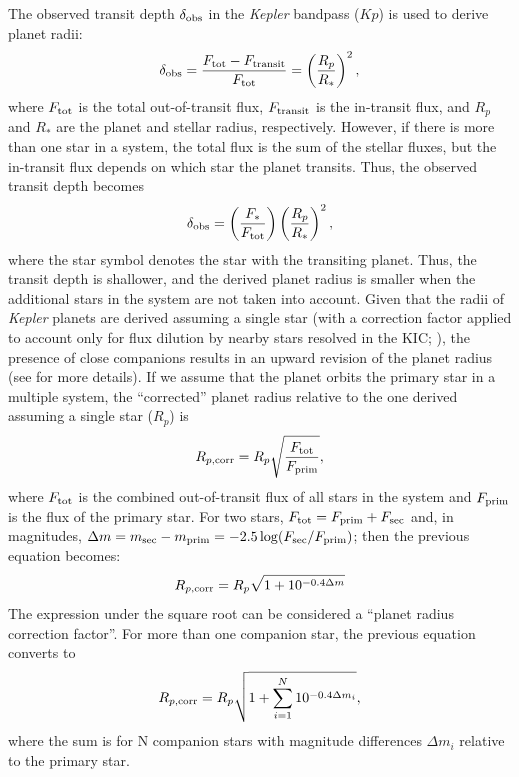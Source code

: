 \documentclass[twocolumn,appendixfloats]{aastex6}
\begin{document}
The observed transit depth $\delta_{\rm obs}$ in the {\it Kepler} bandpass 
($Kp$) is used to derive planet radii:
\begin{equation}
\delta_{\rm obs} = \frac{F_{\rm tot}-F_{\rm transit}}{F_{\rm tot}} = 
\left( \frac{R_p}{R_{\ast}} \right)^2, 
\end{equation}
where $F_{\rm tot}$ is the total out-of-transit flux, $F_{\rm transit}$
is the in-transit flux, and $R_p$ and $R_{\ast}$ are the planet and stellar
radius, respectively. However, if there is more than one star in a
system, the total flux is the sum of the stellar fluxes, but the in-transit flux
depends on which star the planet transits. Thus, the observed transit
depth becomes
\begin{equation}
\delta_{\rm obs} = \left( \frac{F_{\ast}}{F_{\rm tot}} \right)
\left( \frac{R_p}{R_{\ast}} \right)^2, 
\end{equation}
where the star symbol denotes the star with the transiting planet. Thus,
the transit depth is shallower, and the derived planet radius is smaller
when the additional stars in the system are not taken into account. 
Given that the radii of {\it Kepler} planets are derived assuming a single
star (with a correction factor applied to account only for flux 
dilution by nearby stars resolved in the KIC; \citealt{mullally15,coughlin16}), 
the presence of close companions results in an upward revision 
of the planet radius (see \citealt{ciardi15} for more details). 
If we assume that the planet orbits the primary star in a multiple system, the 
``corrected'' planet radius relative to the one derived assuming a single star 
($R_p$) is
\begin{equation}
R_{p, \rm corr} = R_p \sqrt{\frac{F_{\rm tot}}{F_{\rm prim}}},
\end{equation}
where $F_{\rm tot}$ is the combined out-of-transit flux of all stars in the 
system and $F_{\rm prim}$ is the flux of the primary star. For two stars, 
$F_{\rm tot}=F_{\rm prim}+F_{\rm sec}$ and, in magnitudes, 
$\Delta m = m_{\rm sec} - m_{\rm prim} = 
- 2.5 \log (F_{\rm sec}/F_{\rm prim})$; then the previous equation 
becomes:
\begin{equation}
R_{p, \rm corr} = R_p \sqrt{1+10^{-0.4 \Delta m}}
\end{equation}
The expression under the square root can be considered a ``planet 
radius correction factor''.
For more than one companion star, the previous equation converts to
\begin{equation}
R_{p, \rm corr} = R_p \sqrt{1+\sum_{i=1}^{N}{10^{-0.4 \Delta m_i}}},
\label{Rcorr}
\end{equation}
where the sum is for N companion stars with magnitude differences
$\Delta m_i$ relative to the primary star. 
\end{document}
